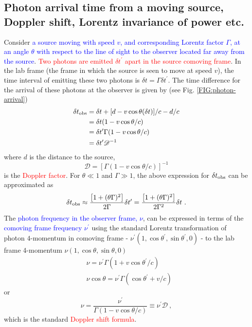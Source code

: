 \documentclass[12pt,a4paper]{article}
\begin{document}
\subsection{Photon arrival time from a moving source, Doppler shift, Lorentz invariance of power etc.}
\cite{2015PhR...561....1K} Consider \textcolor{blue}{a source moving with speed $v$, and corresponding Lorentz factor $\Gamma$, at an angle $\theta$ with respect to the line of sight to the observer located far away from the source}. \textcolor{red}{Two photons are emitted $\delta t^\prime$ apart in the source comoving frame}. In the lab frame (the frame in which the source is seen to move at speed $v$), the time interval of emitting these two photons is $\delta t = \Gamma \delta t^\prime$. The time difference for the arrival of these photons at the observer is given by (see Fig. \ref{FIG:photon-arrival})
\begin{align}
\nonumber \delta t_{\rm obs} &= \delta t +[d -v\cos \theta (\delta t)]/c -d/c \\
\nonumber &= \delta t (1 -v \cos \theta /c) \\
\nonumber &= \delta t^\prime \Gamma (1 -v \cos \theta /c) \\
&= \delta t^\prime \mathscr D^{-1} 
\label{observer-time}
\end{align}
where $d$ is the distance to the source,
\begin{equation}
\mathscr D = [\Gamma (1 -v \cos \theta /c)]^{-1}
\end{equation}
is the \textcolor{red}{Doppler factor}. For $\theta \ll 1$ and $\Gamma \gg 1$, the above expression for $\delta t_{\rm obs}$ can be approximated as
\begin{equation}
\delta t_{\rm obs} \approx \dfrac{\left[1 +(\theta \Gamma)^2\right]}{2\Gamma} \delta t^\prime = \dfrac{\left[1 +(\theta \Gamma)^2 \right]}{2 \Gamma^2} \delta t ~.
\end{equation}
The \textcolor{blue}{photon frequency in the observer frame, $\nu$}, can be expressed in terms of the \textcolor{blue}{comoving frame frequency $\nu^\prime$} using the standard Lorentz transformation of photon $4$-momentum in comoving frame - $\nu^\prime(1, \cos \theta^\prime, \sin \theta^\prime, 0)$ - to the lab frame 4-momentum $\nu(1, \cos \theta, \sin \theta, 0)$
\begin{align}
& \nu = \nu^\prime \Gamma (1 +v \cos \theta^\prime /c) \\
&\nu \cos \theta = \nu^\prime \Gamma (\cos \theta^\prime +v/c)
\end{align}
or
\begin{equation}
 \nu = \dfrac{ \nu^\prime}{\Gamma (1 -v \cos \theta /c)} \equiv  \nu^\prime \mathscr D ~,
\end{equation}
which is the standard \textcolor{red}{Doppler shift formula}.
\end{document}
